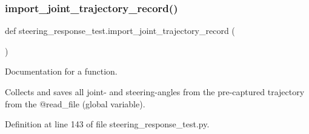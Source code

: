 \mbox{\label{namespacesteering__response__test_a894a6cd85840974184c9da11ccbb7bd4}} 
\subsubsection{\texorpdfstring{import\_joint\_trajectory\_record()}{import\_joint\_trajectory\_record()}}
{\footnotesize\ttfamily def steering\+\_\+response\+\_\+test.\+import\+\_\+joint\+\_\+trajectory\+\_\+record (\begin{DoxyParamCaption}{ }\end{DoxyParamCaption})}



Documentation for a function. 

Collects and saves all joint-\/ and steering-\/angles from the pre-\/captured trajectory from the @read\+\_\+file (global variable). 

Definition at line 143 of file steering\+\_\+response\+\_\+test.\+py.


